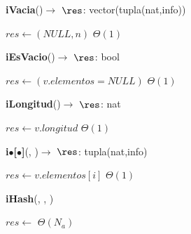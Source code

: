 \begin{Algoritmos}

\begin{algorithm}[H]{\textbf{iVacia}()$\to$ $\res$: vector(tupla(nat,info))}
	\begin{algorithmic}
            \State $res \gets (NULL,n)$		\Comment $\Theta(1)$
            
	\end{algorithmic}
\end{algorithm}

\begin{algorithm}[H]{\textbf{iEsVacio}()$\to$ $\res$: bool}
	\begin{algorithmic}
            \State $res\gets(v.elementos = NULL)$	\Comment $\Theta(1)$
            
	\end{algorithmic}
\end{algorithm}


\begin{algorithm}[H]{\textbf{iLongitud}()$\to$ $\res$: nat}
	\begin{algorithmic}
            
            \State $res \gets v.longitud$													\Comment $\Theta(1)$
           
	\end{algorithmic}
\end{algorithm}


  \begin{algorithm}[H]{\textbf{i$\bullet$[$\bullet$]}(, )$\to$ $\res$: tupla(nat,info)}
	\begin{algorithmic}
    \State $res \gets v.elementos[i]$       \Comment $\Theta(1)$    
	\end{algorithmic}
\end{algorithm}


\begin{algorithm}[H]{\textbf{iHash}(, ,     )}
	\begin{algorithmic}
            
            \State $res \gets $													\Comment $\Theta(N_{a})$
           
	\end{algorithmic}
\end{algorithm}
\end{Algoritmos}
